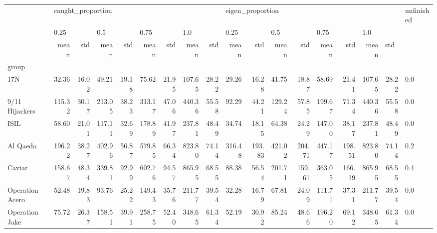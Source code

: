 \begin{tabular}{lrrrrrrrrrrrrrrrrl}
\toprule
{} & \multicolumn{8}{l}{caught\_proportion} & \multicolumn{8}{l}{eigen\_proportion} & unfinished \\
{} & \multicolumn{2}{l}{0.25} & \multicolumn{2}{l}{0.5} & \multicolumn{2}{l}{0.75} & \multicolumn{2}{l}{1.0} & \multicolumn{2}{l}{0.25} & \multicolumn{2}{l}{0.5} & \multicolumn{2}{l}{0.75} & \multicolumn{3}{l}{1.0} \\
{} &              mean &    std &    mean &    std &    mean &    std &    mean &    std &             mean &     std &    mean &     std &    mean &     std &    mean & \multicolumn{2}{l}{std} \\
group                &                   &        &         &        &         &        &         &        &                  &         &         &         &         &         &         &        &            \\
\midrule
17N                  &             32.36 &  16.02 &   49.21 &  19.18 &   75.62 &  21.95 &  107.65 &  28.22 &            29.26 &   16.28 &   41.75 &   18.87 &   58.69 &   21.41 &  107.65 &  28.22 &        0.0 \\
9/11 Hijackers       &            115.32 &  30.17 &  213.05 &  38.23 &  313.17 &  47.06 &  440.36 &  55.58 &            92.29 &   44.21 &  129.24 &   57.85 &  199.67 &   71.34 &  440.36 &  55.58 &        0.0 \\
ISIL                 &             58.60 &  21.01 &  117.11 &  32.69 &  178.89 &  41.97 &  237.81 &  48.49 &            34.74 &   18.15 &   64.38 &   24.29 &  147.00 &   38.17 &  237.81 &  48.49 &        0.0 \\
Al Qaeda             &            196.22 &  38.27 &  402.96 &  56.87 &  579.85 &  66.34 &  823.80 &  74.14 &           316.48 &  193.83 &  421.02 &  204.71 &  447.17 &  198.51 &  823.80 &  74.14 &        0.2 \\
Caviar               &            158.67 &  48.34 &  339.81 &  92.99 &  602.76 &  94.57 &  865.95 &  68.55 &            88.38 &   56.54 &  201.71 &  159.61 &  363.05 &  166.19 &  865.95 &  68.55 &        0.4 \\
Operation Acero      &             52.48 &  19.83 &   93.76 &  25.22 &  149.43 &  35.76 &  211.77 &  39.54 &            32.28 &   16.79 &   67.81 &   24.09 &  111.71 &   37.31 &  211.77 &  39.54 &        0.0 \\
Operation Jake       &             75.72 &  26.37 &  158.51 &  39.91 &  258.75 &  52.40 &  348.65 &  61.34 &            52.19 &   30.92 &   85.24 &   48.66 &  196.20 &   69.12 &  348.65 &  61.34 &        0.0 \\

\end{tabular}
